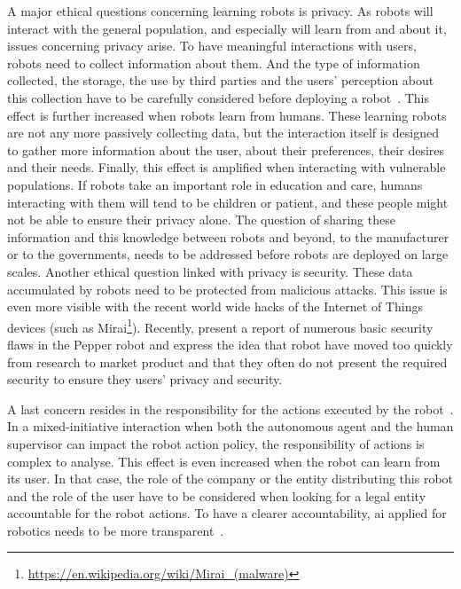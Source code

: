A major ethical questions concerning learning robots is privacy. As robots will interact with the general population, and especially will learn from and about it, issues concerning privacy arise. To have meaningful interactions with users, robots need to collect information about them. And the type of information collected, the storage, the use by third parties and the users' perception about this collection have to be carefully considered before deploying a robot~\citep{syrdal2007he}. This effect is further increased when robots learn from humans. These learning robots are not any more passively collecting data, but the interaction itself is designed to gather more information about the user, about their preferences, their desires and their needs. Finally, this effect is amplified when interacting with vulnerable populations. If robots take an important role in education and care, humans interacting with them will tend to be children or patient, and these people might not be able to ensure their privacy alone. The question of sharing these information and this knowledge between robots and beyond, to the manufacturer or to the governments, needs to be addressed before robots are deployed on large scales. Another ethical question linked with privacy is security. These data accumulated by robots need to be protected from malicious attacks. This issue is even more visible with the recent world wide hacks of the Internet of Things devices (such as Mirai\footnote{\url{https://en.wikipedia.org/wiki/Mirai_(malware)}}). Recently, \cite{giaretta2018adding} present a report of numerous basic security flaws in the Pepper robot and express the idea that robot have moved too quickly from research to market product and that they often do not present the required security to ensure they users' privacy and security.

A last concern resides in the responsibility for the actions executed by the robot~\citep{asaro2007robots}. In a mixed-initiative interaction when both the autonomous agent and the human supervisor can impact the robot action policy, the responsibility of actions is complex to analyse. This effect is even increased when the robot can learn from its user. In that case, the role of the company or the entity distributing this robot and the role of the user have to be considered when looking for a legal entity accountable for the robot actions. To have a clearer accountability, \gls{ai} applied for robotics needs to be more transparent~\citep{wachter2017transparent}.


